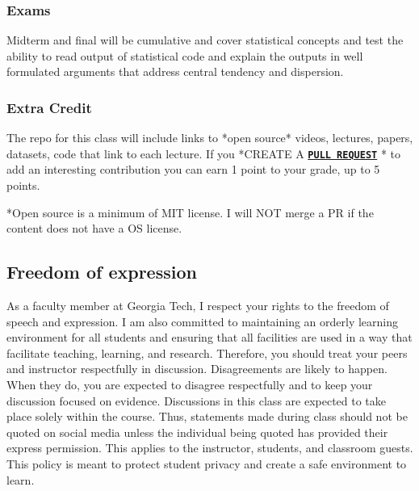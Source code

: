 \documentclass[11pt]{article}
\begin{document}
\subsubsection*{Exams}
Midterm and final will be cumulative and cover statistical concepts and test the ability to read output of statistical code and explain the outputs in well formulated arguments that address central tendency and dispersion.


\subsubsection*{Extra Credit}
The repo for this class will include links to *open source* videos, lectures, papers, datasets, code that link to each lecture. If you *CREATE A \href{https://docs.github.com/en/pull-requests/collaborating-with-pull-requests/proposing-changes-to-your-work-with-pull-requests/creating-a-pull-request}{\tt\bf  PULL REQUEST} * to add an interesting contribution you can earn 1 point to your grade, up to 5 points.


*Open source is a minimum of MIT license. I will NOT merge a PR if the content does not have a OS license.



\subsection*{Freedom of expression}
As   a   faculty   member   at   Georgia   Tech,   I   respect   your   rights   to   the   freedom   of   speech   and
expression.  I am also committed to maintaining an orderly learning environment for all students
and ensuring that all facilities are used in a way that facilitate teaching, learning, and research.
Therefore, you should treat your peers and instructor respectfully in discussion.  Disagreements
are likely to happen. When they do, you are expected to disagree respectfully and to keep your
discussion focused on evidence.
Discussions in this class are expected to take place solely within the course.   Thus, statements
made during class should not be quoted on social media unless the individual being quoted has
provided their express permission.  This applies to the instructor, students, and classroom guests.
This policy is meant to protect student privacy and create a safe environment to learn.
\end{document}
